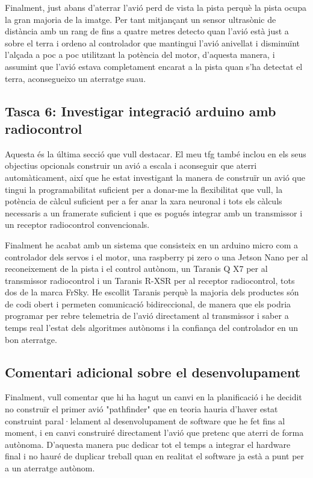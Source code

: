 \documentclass[10pt,a4paper,twocolumn,twoside]{article}
\begin{document}
Finalment, just abans d'aterrar l'avió perd de vista la pista perquè la pista ocupa la gran majoria de la imatge. Per tant
mitjançant un sensor ultrasònic de distància amb un rang de fins a quatre metres detecto quan l'avió està just a sobre el terra
i ordeno al controlador que mantingui l'avió anivellat i disminuïnt l'alçada a poc a poc utilitzant la potència del motor, d'aquesta
manera, i assumint que l'avió estava completament encarat a la pista quan s'ha detectat el terra, aconsegueixo un aterratge suau.


\subsection{Tasca 6: Investigar integració arduino amb radiocontrol}
Aquesta és la última secció que vull destacar. El meu tfg també inclou en els seus objectius opcionals construir un avió a escala i aconseguir
que aterri automàticament, així que he estat investigant la manera de construïr un avió que tingui la programabilitat suficient per a donar-me
la flexibilitat que vull, la potència de càlcul suficient per a fer anar la xara neuronal i tots els càlculs necessaris a un framerate suficient
i que es pogués integrar amb un transmissor i un receptor radiocontrol convencionals.

Finalment he acabat amb un sistema que consisteix en un arduino micro com a controlador dels servos i el motor, una raspberry pi zero o 
una Jetson Nano per al reconeixement de la pista i el control autònom, un Taranis Q X7 per al transmissor radiocontrol i un Taranis R-XSR
per al receptor radiocontrol, tots dos de la marca FrSky. He escollit Taranis perquè la majoria dels productes són de codi obert i permeten
comunicació bidireccional, de manera que els podria programar per rebre telemetria de l'avió directament al transmissor i saber a temps real
l'estat dels algoritmes autònoms i la confiança del controlador en un bon aterratge.

\subsection{Comentari adicional sobre el desenvolupament}
Finalment, vull comentar que hi ha hagut un canvi en la planificació i he decidit no construïr el primer avió "pathfinder" que en teoria 
hauria d'haver estat construint paral·lelament al desenvolupament de software que he fet fins al moment, i en canvi construiré 
directament l'avió que pretenc que aterri de forma autònoma. D'aquesta manera puc dedicar tot el temps a integrar el hardware final 
i no hauré de duplicar treball quan en realitat el software ja està a punt per a un aterratge autònom.
\end{document}
